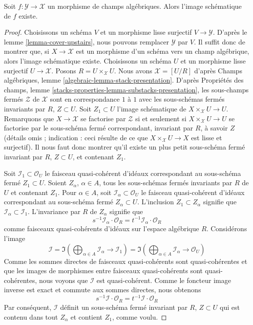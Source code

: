 \begin{lemma}
\label{lemma-scheme-theoretic-image-existence}
Soit $f : \mathcal{Y} \to \mathcal{X}$ un morphisme de champs algébriques.
Alors l'image schématique de $f$ existe.
\end{lemma}

\begin{proof}
Choisissons un schéma $V$ et un morphisme lisse surjectif $V \to \mathcal{Y}$.
D'après le lemme \ref{lemma-cover-upstairs}, nous pouvons remplacer $\mathcal{Y}$ par $V$.
Il suffit donc de montrer que, si $X \to \mathcal{X}$ est un morphisme d'un
schéma vers un champ algébrique, alors l'image schématique existe.
Choisissons un schéma $U$ et un morphisme lisse surjectif $U \to \mathcal{X}$.
Posons $R = U \times_\mathcal{X} U$.
Nous avons $\mathcal{X} = [U/R]$ d'après
Champs algébriques, lemme \ref{algebraic-lemma-stack-presentation}.
D'après Propriétés des champs, lemme
\ref{stacks-properties-lemma-substacks-presentation},
les sous-champs fermés $\mathcal{Z}$ de $\mathcal{X}$
sont en correspondance $1$ à $1$ avec les sous-schémas fermés invariants
par $R$, $Z \subset U$.
Soit $Z_1 \subset U$ l'image schématique de
$X \times_\mathcal{X} U \to U$.
Remarquons que $X \to \mathcal{X}$ se factorise par $\mathcal{Z}$
si et seulement si $X \times_\mathcal{X} U \to U$ se factorise par
le sous-schéma fermé correspondant, invariant par $R$, à savoir $Z$
(détails omis ; indication : ceci résulte de ce que
$X \times_\mathcal{X} U \to X$ est lisse et surjectif).
Il nous faut donc montrer qu'il existe un plus petit sous-schéma fermé
invariant par $R$, $Z \subset U$, et contenant $Z_1$.

\medskip\noindent
Soit $\mathcal{I}_1 \subset \mathcal{O}_U$ le faisceau quasi-cohérent
d'idéaux correspondant au sous-schéma fermé $Z_1 \subset U$.
Soient $Z_\alpha$, $\alpha \in A$, tous les sous-schémas fermés invariants
par $R$ de $U$ et contenant $Z_1$.
Pour $\alpha \in A$, soit $\mathcal{I}_\alpha \subset \mathcal{O}_U$
le faisceau quasi-cohérent d'idéaux correspondant au sous-schéma fermé
$Z_\alpha \subset U$. L'inclusion $Z_1 \subset Z_\alpha$
signifie que $\mathcal{I}_\alpha \subset \mathcal{I}_1$.
L'invariance par $R$ de $Z_\alpha$ signifie que
$$
s^{-1}\mathcal{I}_\alpha \cdot \mathcal{O}_R =
t^{-1}\mathcal{I}_\alpha \cdot \mathcal{O}_R
$$
comme faisceaux quasi-cohérents d'idéaux sur l'espace algébrique $R$.
Considérons l'image
$$
\mathcal{I} =
\Im\left(
\bigoplus\nolimits_{\alpha \in A} \mathcal{I}_\alpha \to \mathcal{I}_1
\right) =
\Im\left(
\bigoplus\nolimits_{\alpha \in A} \mathcal{I}_\alpha \to \mathcal{O}_U
\right)
$$
Comme les sommes directes de faisceaux quasi-cohérents sont quasi-cohérentes
et que les images de morphismes entre faisceaux quasi-cohérents sont
quasi-cohérentes, nous voyons que $\mathcal{I}$ est quasi-cohérent.
Comme le foncteur image inverse est exact et commute aux sommes directes, nous obtenons
$$
s^{-1}\mathcal{I} \cdot \mathcal{O}_R =
t^{-1}\mathcal{I} \cdot \mathcal{O}_R
$$
Par conséquent, $\mathcal{I}$ définit un sous-schéma fermé invariant par $R$,
$Z \subset U$ qui est contenu dans tout $Z_\alpha$ et contient
$Z_1$, comme voulu.
\end{proof}

